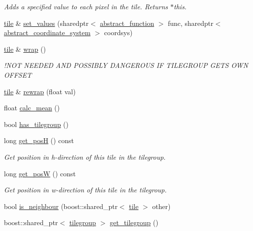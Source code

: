 \begin{DoxyCompactItemize}
\begin{DoxyCompactList}\small\item\em Adds a specified value to each pixel in the tile. Returns $\ast$this. \end{DoxyCompactList}\item 
\hyperlink{classtile}{tile} \& \hyperlink{classtile_ae49006ba53d712e098409e4e7e679d8d}{set\-\_\-values} (sharedptr$<$ \hyperlink{classabstract__function}{abstract\-\_\-function} $>$ func, sharedptr$<$ \hyperlink{classabstract__coordinate__system}{abstract\-\_\-coordinate\-\_\-system} $>$ coordsys)
\item 
\hyperlink{classtile}{tile} \& \hyperlink{classtile_a0e331de98d713a293c2d09524ceb2abb}{wrap} ()
\begin{DoxyCompactList}\small\item\em !\-N\-O\-T N\-E\-E\-D\-E\-D A\-N\-D P\-O\-S\-S\-I\-B\-L\-Y D\-A\-N\-G\-E\-R\-O\-U\-S I\-F T\-I\-L\-E\-G\-R\-O\-U\-P G\-E\-T\-S O\-W\-N O\-F\-F\-S\-E\-T \end{DoxyCompactList}\item 
\hyperlink{classtile}{tile} \& \hyperlink{classtile_a04907d189cf875a5749d751a8af1c7a9}{rewrap} (float val)
\item 
float \hyperlink{classtile_a6e5a33cfdb72b176001bc47d2e13f208}{calc\-\_\-mean} ()
\item 
bool \hyperlink{classtile_a388f69f6e58d5bf92a028d58269774f5}{has\-\_\-tilegroup} ()
\item 
\hypertarget{classtile_ad9c68142f0e04176f81d0b512b707f94}{long \hyperlink{classtile_ad9c68142f0e04176f81d0b512b707f94}{get\-\_\-pos\-H} () const }\label{classtile_ad9c68142f0e04176f81d0b512b707f94}

\begin{DoxyCompactList}\small\item\em Get position in h-\/direction of this tile in the tilegroup. \end{DoxyCompactList}\item 
\hypertarget{classtile_ab7c3e805886c7acc10eaad668b54c23f}{long \hyperlink{classtile_ab7c3e805886c7acc10eaad668b54c23f}{get\-\_\-pos\-W} () const }\label{classtile_ab7c3e805886c7acc10eaad668b54c23f}

\begin{DoxyCompactList}\small\item\em Get position in w-\/direction of this tile in the tilegroup. \end{DoxyCompactList}\item 
bool \hyperlink{classtile_a67e26234566d6ed3033c98ae0cadd3d0}{is\-\_\-neighbour} (boost\-::shared\-\_\-ptr$<$ \hyperlink{classtile}{tile} $>$ other)
\item 
boost\-::shared\-\_\-ptr$<$ \hyperlink{classtilegroup}{tilegroup} $>$ \hyperlink{classtile_a495fcf79bc5b2dd4286467dd9d8bc999}{get\-\_\-tilegroup} ()
\end{DoxyCompactItemize}
